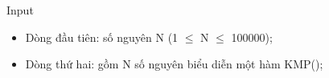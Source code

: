 Input
\begin{itemize}
	\item     Dòng đầu tiên: số nguyên N (1  $\le$  N  $\le$  100000);   
	\item     Dòng thứ hai: gồm N số nguyên biểu diễn một hàm KMP();   
\end{itemize}